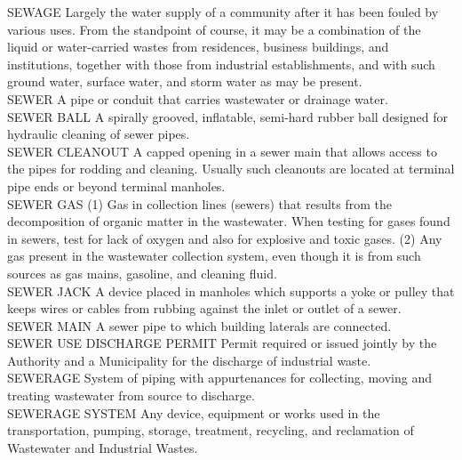 \documentclass{article}
\begin{document}
SEWAGE
Largely the water supply of a community after it has been fouled by various uses. From the standpoint of course, it may be a combination of the liquid or water-carried wastes from residences, business buildings, and institutions, together with those from industrial establishments, and with such ground water, surface water, and storm water as may be present.
\vspace{0.3cm}\\
SEWER
A pipe or conduit that carries wastewater or drainage water. 
\vspace{0.3cm}\\
SEWER BALL
A spirally grooved, inflatable, semi-hard rubber ball designed for hydraulic cleaning of sewer pipes. 
\vspace{0.3cm}\\
SEWER CLEANOUT
A capped opening in a sewer main that allows access to the pipes for rodding and cleaning. Usually such cleanouts are located at terminal pipe ends or beyond terminal manholes. 
\vspace{0.3cm}\\
SEWER GAS
(1) Gas in collection lines (sewers) that results from the decomposition of organic matter in the wastewater. When testing for gases found in sewers, test for lack of oxygen and also for explosive and toxic gases. (2) Any gas present in the wastewater collection system, even though it is from such sources as gas mains, gasoline, and cleaning fluid. 
\vspace{0.3cm}\\
SEWER JACK
A device placed in manholes which supports a yoke or pulley that keeps wires or cables from rubbing against the inlet or outlet of a sewer. 
\vspace{0.3cm}\\
SEWER MAIN
A sewer pipe to which building laterals are connected. 
\vspace{0.3cm}\\
SEWER USE DISCHARGE PERMIT
Permit required or issued jointly by the Authority and a Municipality for the discharge of industrial waste.
\vspace{0.3cm}\\
SEWERAGE
System of piping with appurtenances for collecting, moving and treating wastewater from source to discharge. 
\vspace{0.3cm}\\
SEWERAGE SYSTEM
Any device, equipment or works used in the transportation, pumping, storage, treatment, recycling, and reclamation of Wastewater and Industrial Wastes. 
\end{document}
